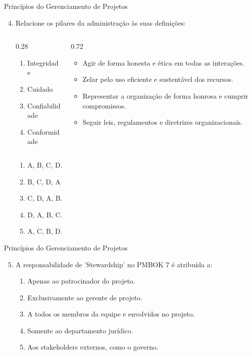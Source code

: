 \documentclass{beamer}
\begin{document}
\begin{frame}{Princípios do Gerenciamento de Projetos}
	\begin{enumerate}
		\setcounter{enumi}{3}
		\justifying
		\item Relacione os pilares da administração às suas definições:
		\begin{columns}
			\begin{column}{0.28\textwidth}
				\begin{enumerate}[A]
					\item Integridade
					\item Cuidado
					\item Confiabilidade
					\item Conformidade
				\end{enumerate}
			\end{column}
			\begin{column}{0.72\textwidth}
				\begin{itemize}
					\item Agir de forma honesta e ética em todas as interações.
					\item Zelar pelo uso eficiente e sustentável dos recursos.
					\item Representar a organização de forma honrosa e cumprir compromissos.
					\item Seguir leis, regulamentos e diretrizes organizacionais.
				\end{itemize}
			\end{column}
		\end{columns}
		\begin{enumerate}[a]
			\item A, B, C, D.
			\item \alert<2>{B, C, D, A}
			\item C, D, A, B.
			\item D, A, B, C.
			\item A, C, B, D.
		\end{enumerate}
	\end{enumerate}
\end{frame}

\begin{frame}{Princípios do Gerenciamento de Projetos}
	\begin{enumerate}
		\setcounter{enumi}{4}
		\justifying
		\item A responsabilidade de 'Stewardship' no PMBOK 7 é atribuída a:
		\begin{enumerate}[a]
			\item Apenas ao patrocinador do projeto.
			\item Exclusivamente ao gerente de projeto.
			\item \alert<2>{A todos os membros da equipe e envolvidos no projeto.}
			\item Somente ao departamento jurídico.
			\item Aos stakeholders externos, como o governo.
		\end{enumerate}
	\end{enumerate}
\end{frame}
\end{document}

